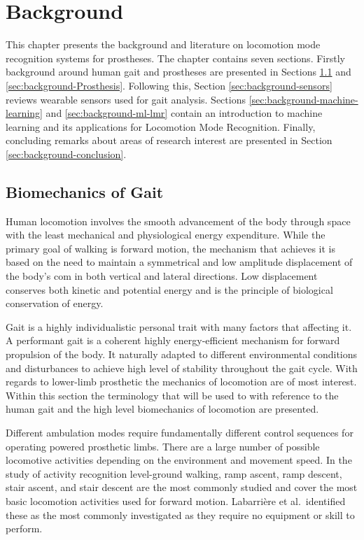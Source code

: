 \chapter{Background}
\label{chp:background}
This chapter presents the background and literature on locomotion mode recognition systems for prostheses. The chapter contains seven sections. Firstly background around human gait and prostheses are presented in Sections \ref{sec:background-gait} and \ref{sec:background-Prosthesis}. Following this, Section \ref{sec:background-sensors} reviews wearable sensors used for gait analysis. Sections \ref{sec:background-machine-learning} and \ref{sec:background-ml-lmr} contain an introduction to machine learning and its applications for Locomotion Mode Recognition. Finally, concluding remarks about areas of research interest are presented in Section \ref{sec:background-conclusion}.

\section{Biomechanics of Gait}
\label{sec:background-gait}
Human locomotion involves the smooth advancement of the body through space with the least mechanical and physiological energy expenditure. While the primary goal of walking is forward motion, the mechanism that achieves it is based on the need to maintain a symmetrical and low amplitude displacement of the body's \acrshort{com} in both vertical and lateral directions. Low displacement conserves both kinetic and potential energy and is the principle of biological conservation of energy.\cite{Waters1999}

Gait is a highly individualistic personal trait with many factors that affecting it\cite{Horst2019}. A performant gait is a coherent highly energy-efficient mechanism for forward propulsion of the body. It naturally adapted to different environmental conditions and disturbances to achieve high level of stability throughout the gait cycle\cite{Shah2020, Mummolo2013}. With regards to lower-limb prosthetic the mechanics of locomotion are of most interest. Within this section the terminology that will be used to with reference to the human gait and the high level biomechanics of locomotion are presented.

Different ambulation modes require fundamentally different control sequences for operating powered prosthetic limbs\cite{Hargrove2015}. There are a large number of possible locomotive activities depending on the environment and movement speed. In the study of activity recognition level-ground walking, ramp ascent, ramp descent, stair ascent, and stair descent are the most commonly studied\cite{Hargrove2013, Young2013, Simon2013, Godiyal2018a, Rai2019, Su2019, Labarriere2020, Srisuwan2021, Bruinsma2021} and cover the most basic locomotion activities used for forward motion\cite{Ebner2020}. Labarri\`ere et al.~identified these as the most commonly investigated as they require no equipment or skill to perform\cite{Labarriere2020}.

